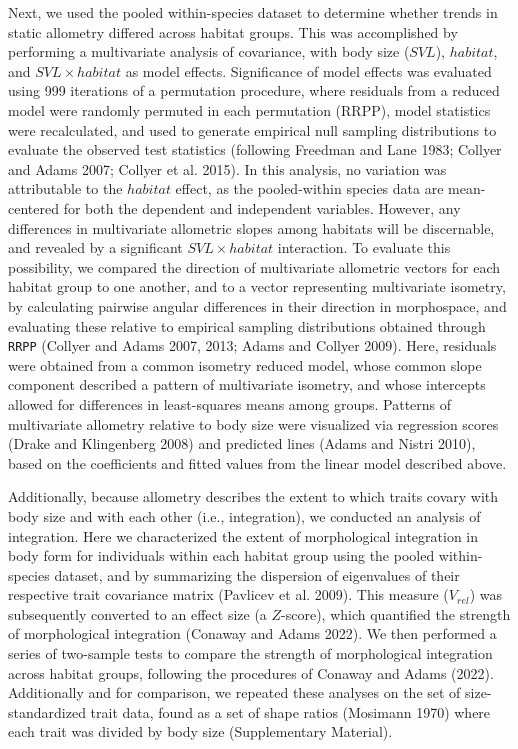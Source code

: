 \documentclass[
  11pt,
]{article}
\begin{document}
Next, we used the pooled within-species dataset to determine whether
trends in static allometry differed across habitat groups. This was
accomplished by performing a multivariate analysis of covariance, with
body size (\(SVL\)), \(habitat\), and \(SVL \times habitat\) as model
effects. Significance of model effects was evaluated using 999
iterations of a permutation procedure, where residuals from a reduced
model were randomly permuted in each permutation (RRPP), model
statistics were recalculated, and used to generate empirical null
sampling distributions to evaluate the observed test statistics
(following Freedman and Lane 1983; Collyer and Adams 2007; Collyer et
al. 2015). In this analysis, no variation was attributable to the
\(habitat\) effect, as the pooled-within species data are mean-centered
for both the dependent and independent variables. However, any
differences in multivariate allometric slopes among habitats will be
discernable, and revealed by a significant \(SVL \times habitat\)
interaction. To evaluate this possibility, we compared the direction of
multivariate allometric vectors for each habitat group to one another,
and to a vector representing multivariate isometry, by calculating
pairwise angular differences in their direction in morphospace, and
evaluating these relative to empirical sampling distributions obtained
through \texttt{RRPP} (Collyer and Adams 2007, 2013; Adams and Collyer
2009). Here, residuals were obtained from a common isometry reduced
model, whose common slope component described a pattern of multivariate
isometry, and whose intercepts allowed for differences in least-squares
means among groups. Patterns of multivariate allometry relative to body
size were visualized via regression scores (Drake and Klingenberg 2008)
and predicted lines (Adams and Nistri 2010), based on the coefficients
and fitted values from the linear model described above. \hfill\break

Additionally, because allometry describes the extent to which traits
covary with body size and with each other (i.e., integration), we
conducted an analysis of integration. Here we characterized the extent
of morphological integration in body form for individuals within each
habitat group using the pooled within-species dataset, and by
summarizing the dispersion of eigenvalues of their respective trait
covariance matrix (Pavlicev et al. 2009). This measure (\(V_{rel}\)) was
subsequently converted to an effect size (a \(Z\)-score), which
quantified the strength of morphological integration (Conaway and Adams
2022). We then performed a series of two-sample tests to compare the
strength of morphological integration across habitat groups, following
the procedures of Conaway and Adams (2022). Additionally and for
comparison, we repeated these analyses on the set of size-standardized
trait data, found as a set of shape ratios (Mosimann 1970) where each
trait was divided by body size (Supplementary Material). \hfill\break
\end{document}
